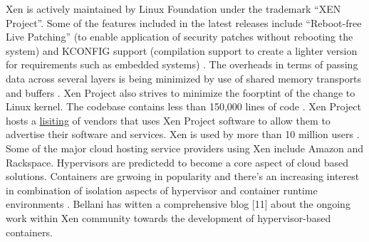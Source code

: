 \documentclass[9pt,twocolumn,twoside]{../../styles/osajnl}
\begin{document}
Xen is actively maintained by Linux Foundation under the trademark “XEN Project”. Some of the features included in the latest releases include “Reboot-free Live Patching” (to enable application of security patches without rebooting the system) and KCONFIG support (compilation support to create a lighter version for requirements such as embedded systems) \cite{www-xen-4.7-feature-list}. The overheads in terms of passing data across several layers is being minimized by use of shared memory transports and buffers \cite{www-tech-comparison}. Xen Project also strives to minimize the foorptint of the change to Linux kernel. The codebase contains less than 150,000 lines of code \cite{www-xen-wiki}. Xen Project hosts a \href{https://xenproject.org/directory/directory.html} {lisiting} of vendors that uses Xen Project software to allow them to advertise their software and services. Xen is used by more than 10 million users \cite{www-hypervisor-17} . Some of the major cloud hosting service providers using Xen include Amazon and Rackspace. Hypervisors are predictedd to become a core aspect of cloud based solutions. Containers are grwoing in popularity and there's an increasing interest in combination of isolation aspects of hypervisor and container runtime environments \cite{www-hypervisor-containers}.  Bellani has witten a comprehensive blog [11] about the ongoing work within Xen community towards the development of hypervisor-based containers.




 
\end{document}
